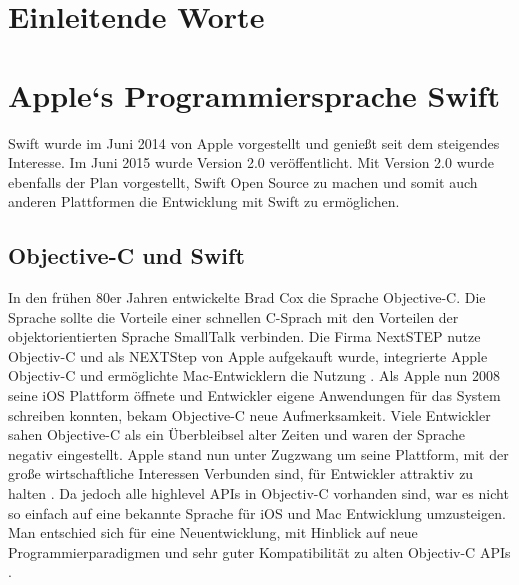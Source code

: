 

\section{Einleitende Worte}

\section{Apple`s Programmiersprache Swift}
Swift wurde im Juni 2014 von Apple vorgestellt und genießt seit dem steigendes Interesse. Im Juni 2015 wurde Version 2.0 veröffentlicht. Mit Version 2.0 wurde ebenfalls der Plan vorgestellt, Swift Open Source zu machen und somit auch anderen Plattformen die Entwicklung mit Swift zu ermöglichen.  
\subsection{Objective-C und Swift}
In den frühen 80er Jahren entwickelte Brad Cox die Sprache Objective-C. Die Sprache sollte die Vorteile einer schnellen C-Sprach mit den Vorteilen der objektorientierten Sprache SmallTalk verbinden. Die Firma NextSTEP nutze Objectiv-C und als NEXTStep von Apple aufgekauft wurde, integrierte Apple Objectiv-C und ermöglichte Mac-Entwicklern die Nutzung \cite{Dalrymple:2009aa}. Als Apple nun 2008 seine iOS Plattform öffnete und Entwickler eigene Anwendungen für das System schreiben konnten, bekam Objective-C neue Aufmerksamkeit. Viele Entwickler sahen Objective-C als ein Überbleibsel alter Zeiten und waren der Sprache negativ eingestellt. Apple stand nun unter Zugzwang um seine Plattform, mit der große wirtschaftliche Interessen Verbunden sind, für Entwickler attraktiv zu halten \cite{tre}. Da jedoch alle highlevel APIs in Objectiv-C vorhanden sind, war es nicht so einfach auf eine bekannte Sprache für iOS und Mac Entwicklung umzusteigen. Man entschied sich für eine Neuentwicklung, mit Hinblick auf neue Programmierparadigmen und sehr guter Kompatibilität zu alten Objectiv-C APIs \cite{tre}.
